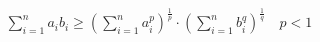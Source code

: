 \documentclass[preview]{standalone}
\begin{document}
\begin{align*}
\sum_{i = 1}^n a_ib_i \geqslant \left(\sum_{i = 1}^{n}a_i^p\right)^{\frac{1}{p}} \cdot \left(\sum_{i = 1}^{n}b_i^q\right)^{\frac{1}{q}}  \quad p < 1
\end{align*}
\end{document}
